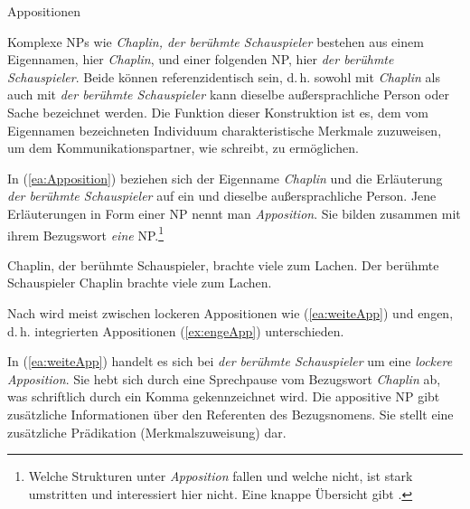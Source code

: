 \begin{Exkurs}{Appositionen}\label{subsection:Apposition}

Komplexe NPs wie \textit{Chaplin, der berühmte Schauspieler} bestehen aus einem Eigennamen, hier \textit{Chaplin}, und einer folgenden NP, hier \textit{der berühmte Schauspieler}. Beide können referenzidentisch sein, d.\,h. sowohl mit \textit{Chaplin} als auch mit \textit{der berühmte Schauspieler} kann dieselbe außersprachliche Person oder Sache bezeichnet werden. Die Funktion dieser Konstruktion ist es, dem vom Eigennamen bezeichneten Individuum charakteristische Merkmale zuzuweisen, um dem Kommunikationspartner, wie \citet[33]{Zifonun2015} schreibt,  zu ermöglichen. 

In (\ref{ea:Apposition}) beziehen sich der Eigenname \textit{Chaplin} und die Erläuterung \textit{der berühmte Schauspieler} auf ein und dieselbe außersprachliche Person. Jene Erläuterungen in Form einer NP nennt man \textit{Apposition}. Sie bilden zusammen mit ihrem Bezugswort \textit{eine} NP.\footnote{Welche Strukturen unter \textit{Apposition} fallen und welche nicht, ist stark umstritten und interessiert hier nicht. Eine knappe Übersicht gibt \citet[32--34]{Zifonun2015}.} 

\ea \label{ea:Apposition}
\ea \label{ea:weiteApp} Chaplin, der berühmte Schauspieler, brachte viele zum Lachen.
\ex \label{ex:engeApp} Der berühmte Schauspieler Chaplin brachte viele zum Lachen.
\z 
\z 

Nach \citet[511]{HelbigBuscha} wird meist zwischen lockeren Appositionen wie (\ref{ea:weiteApp}) und engen, d.\,h. integrierten Appositionen (\ref{ex:engeApp}) unterschieden. 

In (\ref{ea:weiteApp}) handelt es sich bei \textit{der berühmte Schauspieler} um eine \textit{lockere Apposition}. Sie hebt sich durch eine Sprechpause vom Bezugswort \textit{Chaplin} ab, was schriftlich durch ein Komma gekennzeichnet wird. Die appositive NP gibt zusätzliche Informationen über den Referenten des Bezugsnomens. Sie stellt eine zusätzliche Prädikation (Merkmalszuweisung) dar. 


\end{Exkurs}
